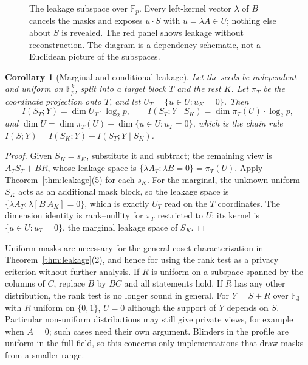 \documentclass[pdflatex,sn-mathphys-num]{sn-jnl}
\theoremstyle{plain}
\newtheorem{corollary}[theorem]{Corollary}
\theoremstyle{definition}
\newcommand{\F}{\mathbb{F}}
\begin{document}
\begin{figure}[htbp]
\centering
\resizebox{\linewidth}{!}{}
\caption{The leakage subspace over $\mathbb F_p$. Every left-kernel vector $\lambda$ of $B$ cancels the masks and exposes $u\cdot S$ with $u=\lambda A\in U$; nothing else about $S$ is revealed. The red panel shows leakage without reconstruction. The diagram is a dependency schematic, not a Euclidean picture of the subspaces.}\label{fig:leakage}
\end{figure}

\begin{corollary}[Marginal and conditional leakage]\label{cor:condleak}
Let the seeds be independent and uniform on $\F_p^k$, split into a target block $T$ and the rest $K$. Let $\pi_T$ be the coordinate projection onto $T$, and let $U_{T}=\{u\in U:u_K=0\}$. Then
\[
 I(S_T;Y)=\dim U_T\cdot\log_2p,\qquad I(S_T;Y\mid S_K)=\dim\pi_T(U)\cdot\log_2p,
\]
and $\dim U=\dim\pi_T(U)+\dim\{u\in U:u_T=0\}$, which is the chain rule $I(S;Y)=I(S_K;Y)+I(S_T;Y\mid S_K)$.
\end{corollary}
\begin{proof}
Given $S_K=s_K$, substitute it and subtract; the remaining view is $A_TS_T+BR$, whose leakage space is $\{\lambda A_T:\lambda B=0\}=\pi_T(U)$. Apply Theorem~\ref{thm:leakage}(5) for each $s_K$. For the marginal, the unknown uniform $S_K$ acts as an additional mask block, so the leakage space is $\{\lambda A_T:\lambda[B\ A_K]=0\}$, which is exactly $U_T$ read on the $T$ coordinates. The dimension identity is rank--nullity for $\pi_T$ restricted to $U$; its kernel is $\{u\in U:u_T=0\}$, the marginal leakage space of $S_K$.
\end{proof}

Uniform masks are necessary for the general coset characterization in Theorem~\ref{thm:leakage}(2), and hence for using the rank test as a privacy criterion without further analysis. If $R$ is uniform on a subspace spanned by the columns of $C$, replace $B$ by $BC$ and all statements hold. If $R$ has any other distribution, the rank test is no longer sound in general. For $Y=S+R$ over $\F_3$ with $R$ uniform on $\{0,1\}$, $U=0$ although the support of $Y$ depends on $S$. Particular non-uniform distributions may still give private views, for example when $A=0$; such cases need their own argument. Blinders in the profile are uniform in the full field, so this concerns only implementations that draw masks from a smaller range.
\end{document}

